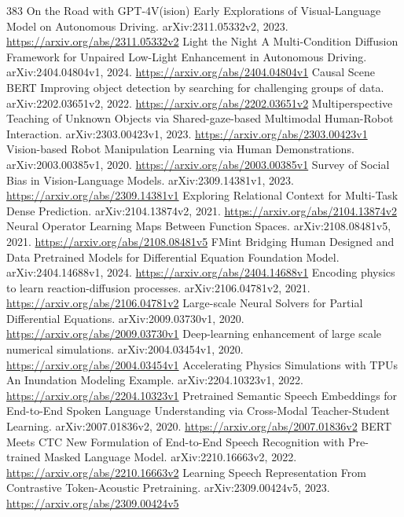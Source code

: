 \documentclass[11pt]{article}
\begin{document}
\begin{thebibliography}{383}
 On the Road with GPT-4V(ision) Early Explorations of Visual-Language Model on Autonomous Driving. arXiv:2311.05332v2, 2023. \url{https://arxiv.org/abs/2311.05332v2}
 Light the Night A Multi-Condition Diffusion Framework for Unpaired Low-Light Enhancement in Autonomous Driving. arXiv:2404.04804v1, 2024. \url{https://arxiv.org/abs/2404.04804v1}
 Causal Scene BERT Improving object detection by searching for challenging groups of data. arXiv:2202.03651v2, 2022. \url{https://arxiv.org/abs/2202.03651v2}
 Multiperspective Teaching of Unknown Objects via Shared-gaze-based Multimodal Human-Robot Interaction. arXiv:2303.00423v1, 2023. \url{https://arxiv.org/abs/2303.00423v1}
 Vision-based Robot Manipulation Learning via Human Demonstrations. arXiv:2003.00385v1, 2020. \url{https://arxiv.org/abs/2003.00385v1}
 Survey of Social Bias in Vision-Language Models. arXiv:2309.14381v1, 2023. \url{https://arxiv.org/abs/2309.14381v1}
 Exploring Relational Context for Multi-Task Dense Prediction. arXiv:2104.13874v2, 2021. \url{https://arxiv.org/abs/2104.13874v2}
 Neural Operator Learning Maps Between Function Spaces. arXiv:2108.08481v5, 2021. \url{https://arxiv.org/abs/2108.08481v5}
 FMint Bridging Human Designed and Data Pretrained Models for Differential Equation Foundation Model. arXiv:2404.14688v1, 2024. \url{https://arxiv.org/abs/2404.14688v1}
 Encoding physics to learn reaction-diffusion processes. arXiv:2106.04781v2, 2021. \url{https://arxiv.org/abs/2106.04781v2}
 Large-scale Neural Solvers for Partial Differential Equations. arXiv:2009.03730v1, 2020. \url{https://arxiv.org/abs/2009.03730v1}
 Deep-learning enhancement of large scale numerical simulations. arXiv:2004.03454v1, 2020. \url{https://arxiv.org/abs/2004.03454v1}
 Accelerating Physics Simulations with TPUs An Inundation Modeling Example. arXiv:2204.10323v1, 2022. \url{https://arxiv.org/abs/2204.10323v1}
 Pretrained Semantic Speech Embeddings for End-to-End Spoken Language Understanding via Cross-Modal Teacher-Student Learning. arXiv:2007.01836v2, 2020. \url{https://arxiv.org/abs/2007.01836v2}
 BERT Meets CTC New Formulation of End-to-End Speech Recognition with Pre-trained Masked Language Model. arXiv:2210.16663v2, 2022. \url{https://arxiv.org/abs/2210.16663v2}
 Learning Speech Representation From Contrastive Token-Acoustic Pretraining. arXiv:2309.00424v5, 2023. \url{https://arxiv.org/abs/2309.00424v5}

\end{thebibliography}
\end{document}
